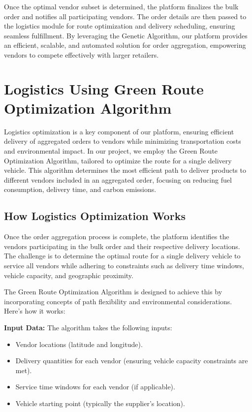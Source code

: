 Once the optimal vendor subset is determined, the platform finalizes the bulk order and notifies all participating vendors. The order details are then passed to the logistics module for route optimization and delivery scheduling, ensuring seamless fulfillment. By leveraging the Genetic Algorithm, our platform provides an efficient, scalable, and automated solution for order aggregation, empowering vendors to compete effectively with larger retailers.

\section{Logistics Using Green Route Optimization Algorithm}

Logistics optimization is a key component of our platform, ensuring efficient delivery of aggregated orders to vendors while minimizing transportation costs and environmental impact. In our project, we employ the Green Route Optimization Algorithm, tailored to optimize the route for a single delivery vehicle. This algorithm determines the most efficient path to deliver products to different vendors included in an aggregated order, focusing on reducing fuel consumption, delivery time, and carbon emissions.

\subsection{How Logistics Optimization Works}

Once the order aggregation process is complete, the platform identifies the vendors participating in the bulk order and their respective delivery locations. The challenge is to determine the optimal route for a single delivery vehicle to service all vendors while adhering to constraints such as delivery time windows, vehicle capacity, and geographic proximity.

The Green Route Optimization Algorithm is designed to achieve this by incorporating concepts of path flexibility and environmental considerations. Here's how it works:

\textbf{Input Data:}  
The algorithm takes the following inputs:
\begin{itemize}
    \item Vendor locations (latitude and longitude).
    \item Delivery quantities for each vendor (ensuring vehicle capacity constraints are met).
    \item Service time windows for each vendor (if applicable).
    \item Vehicle starting point (typically the supplier's location).
\end{itemize}

